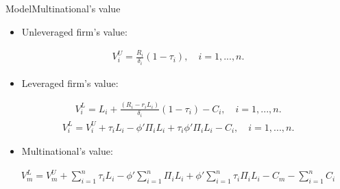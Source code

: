 \documentclass{beamer}
\begin{document}
\begin{frame}{Model}{Multinational's value}
\begin{itemize}
	\item  Unleveraged firm's value:
\end{itemize}
\begin{equation}
\begin{aligned}
V_i^U=\frac{R_i}{\delta_i}(1-\tau_{i}),  \quad i=1,...,n.
\end{aligned}
\label{eq:v_u}
\end{equation}
\begin{itemize}
	\item Leveraged firm's value:
\end{itemize}
\begin{equation}
\begin{aligned}
V_i^L=L_i+\frac{(R_i-r_iL_i)}{\delta_i}(1-\tau_{i})-C_i,  \quad i=1,...,n.
\end{aligned}
\label{eq:v_l_1}
\end{equation}
\begin{equation}
\begin{aligned}
V_i^L=V_i^U+\tau_{i}L_i-\phi'\Pi_iL_i+\tau_{i}\phi'\Pi_iL_i-C_i,  \quad i=1,...,n.
\end{aligned}
\label{eq:v_l_2}
\end{equation}	
\begin{itemize}
	\item Multinational's value:
\end{itemize}
\begin{equation}
\begin{aligned}
V_m^L=V_m^U+\sum_{i=1}^{n}\tau_iL_i-\phi'\sum_{i=1}^{n}\Pi_iL_i+\phi'\sum_{i=1}^{n}\tau_i\Pi_i L_i-C_m-\sum_{i=1}^{n}C_i
\end{aligned}
\label{eq:v_l}
\end{equation}
\end{frame}
\end{document}
